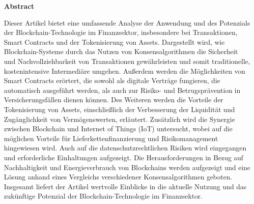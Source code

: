 \textbf{Abstract} 

\vspace{1.5cm}


Dieser Artikel bietet eine umfassende Analyse der Anwendung und des Potenzials der 
Blockchain-Technologie im Finanzsektor, insbesondere bei Transaktionen, Smart Contracts und 
der Tokenisierung von Assets. 
Dargestellt wird, wie Blockchain-Systeme durch das Nutzen von 
Konsensalgorithmen die Sicherheit und Nachvollziehbarkeit von Transaktionen gewährleisten 
und somit traditionelle, kostenintensive Intermediäre umgehen. 
Außerdem werden die
Möglichkeiten von Smart Contracts erörtert, die sowohl als digitale Verträge fungieren, 
die automatisch ausgeführt werden, als auch zur Risiko- und Betrugsprävention in 
Versicherungsfällen dienen können. Des Weiteren werden die Vorteile der Tokenisierung von 
Assets, einschließlich der Verbesserung der Liquidität und Zugänglichkeit von 
Vermögenswerten, erläutert. Zusätzlich wird die Synergie zwischen Blockchain und Internet 
of Things (IoT) untersucht, wobei auf die möglichen Vorteile für 
Lieferkettenfinanzierung und Risikomanagement hingewiesen wird. Auch auf die 
datenschutzrechtlichen Risiken wird eingegangen und erforderliche Einhaltungen aufgezeigt.
Die Herausforderungen in Bezug auf Nachhaltigkeit und 
Energieverbrauch von Blockchains werden aufgezeigt und eine Lösung anhand eines 
Vergleichs verschiedener Konsensalgorithmen geboten. Insgesamt liefert der Artikel wertvolle 
Einblicke in die aktuelle Nutzung 
und das zukünftige Potenzial der Blockchain-Technologie im Finanzsektor.